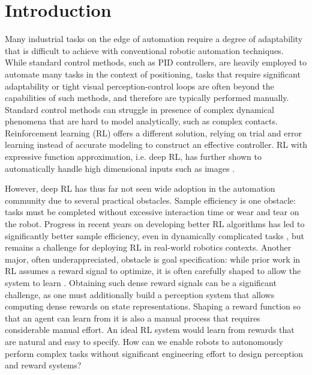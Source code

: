 \section{Introduction}\label{sec:introduction}

Many industrial tasks on the edge of automation require a degree of adaptability that is difficult to achieve with conventional robotic automation techniques.
While standard control methods, such as PID controllers, are heavily employed to automate many tasks in the context of positioning, tasks that require significant adaptability or tight visual perception-control loops are often beyond the capabilities of such methods, and therefore are typically performed manually.
Standard control methods can struggle in presence of complex dynamical phenomena that are hard to model analytically, such as complex contacts.
Reinforcement learning (RL) offers a different solution, relying on trial and error learning instead of accurate modeling to construct an effective controller.
RL with expressive function approximation, i.e. deep RL, has further shown to automatically handle high dimensional inputs such as images \cite{mnih2013atari}.

However, deep RL has thus far not seen wide adoption in the automation community due to several practical obstacles. 
Sample efficiency is one obstacle: tasks must be completed without excessive interaction time or wear and tear on the robot. Progress in recent years on developing better RL algorithms has led to significantly better sample efficiency, even in dynamically complicated tasks \cite{haarnoja2018sac, hessel2018rainbow},
but remains a challenge for deploying RL in real-world robotics contexts.
Another major, often underappreciated, obstacle is goal specification: while prior work in RL assumes a reward signal to optimize,
it is often carefully shaped to allow the system to learn \cite{ng1999rewardshaping, popov17stacking, daniel2014activereward}. 
Obtaining such dense reward signals can be a significant challenge, as one must additionally build a perception system that allows computing dense rewards on state representations. Shaping a reward function so that an agent can learn from it is also a manual process that requires considerable manual effort. An ideal RL system would learn from rewards that are natural and easy to specify.
How can we enable robots to autonomously perform complex tasks without significant engineering effort to design perception and reward systems?

